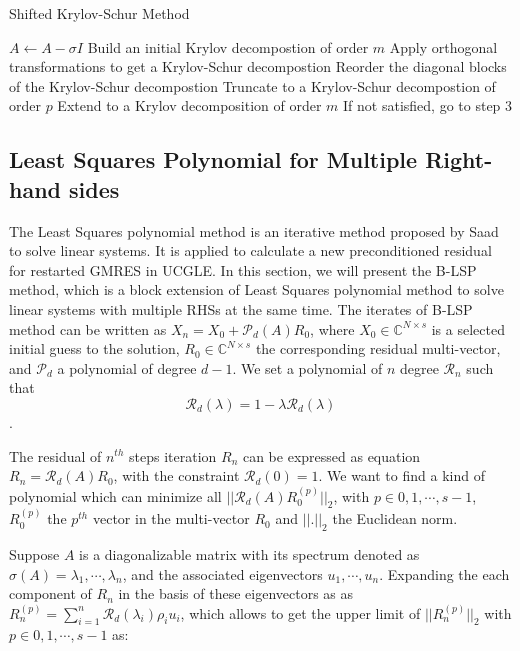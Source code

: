 \begin{algorithm}[htbp]{}
	\caption{Shifted Krylov-Schur Method}   
	\label{alg:krylov-schur-2}   
	\begin{algorithmic}[1]
		\State $A \leftarrow A-\sigma I$ 
		\State Build an initial Krylov decompostion of order $m$
		\State Apply orthogonal transformations to get a Krylov-Schur decompostion
		\State Reorder the diagonal blocks of the Krylov-Schur decompostion
		\State Truncate to a Krylov-Schur decompostion of order $p$
		\State Extend to a Krylov decomposition of order $m$
		\State If not satisfied, go to step 3
		\EndFunction
	\end{algorithmic}  
\end{algorithm}

\subsection{Least Squares Polynomial for Multiple Right-hand sides}

The Least Squares polynomial method is an iterative method proposed by Saad \cite{saad1987least} to solve linear systems. It is applied to calculate a new preconditioned residual for restarted GMRES in UCGLE. In this section, we will present the B-LSP method, which is a block extension of Least Squares polynomial method to solve linear systems with multiple RHSs at the same time. The iterates of B-LSP method can be written as $X_n=X_0+\mathcal{P}_d(A)R_0$, where $X_0 \in \mathbb{C}^{N\times s}$ is a selected initial guess to the solution, $R_0 \in \mathbb{C}^{N\times s}$ the corresponding residual multi-vector, and $\mathcal{P}_d$ a polynomial of degree \(d-1\). We set a polynomial of $n$ degree $\mathcal{R}_n$ such that \[\mathcal{R}_d(\lambda)=1-\lambda \mathcal{R}_d(\lambda)\].

The residual of \(n^{th}\) steps iteration \(R_n\) can be expressed as equation $R_n=\mathcal{R}_d(A)R_0$, with the constraint \(\mathcal{R}_d(0)=1\). We want to find a kind of polynomial which can minimize all \(||\mathcal{R}_d(A)R_0^{(p)}||_2\), with $p \in 0,1,\cdots,s-1$, $R_0^{(p)}$ the $p^{th}$ vector in the multi-vector $R_0$ and \(||.||_2\) the Euclidean norm.

Suppose $A$ is a diagonalizable matrix with its spectrum denoted as \(\sigma(A)=\lambda_1, \cdots, \lambda_n\), and the associated eigenvectors \(u_1, \cdots, u_n\). Expanding the each component of \(R_n\) in the basis of these eigenvectors as as $R_n^{(p)}=\sum_{i=1}^{n}\mathcal{R}_d(\lambda_i)\rho_i u_i$, which allows to get the upper limit of $||R_n^{(p)}||_2$ with $p \in 0,1,\cdots,s-1$ as:

